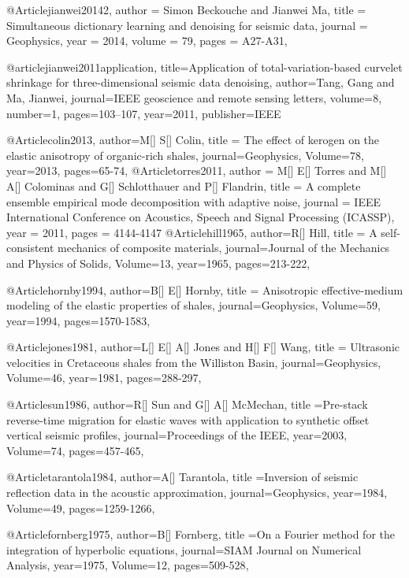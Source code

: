 {@Article{jianwei20142,
  author = 	 {Simon Beckouche and Jianwei Ma},
  title = 	 {Simultaneous dictionary learning and denoising for seismic data},
  journal = 	 {Geophysics},
  year = 	 2014,
  volume =	 79,
  pages =	 {A27-A31},
}

@article{jianwei2011application,
  title={Application of total-variation-based curvelet shrinkage for three-dimensional seismic data denoising},
  author={Tang, Gang and Ma, Jianwei},
  journal={IEEE geoscience and remote sensing letters},
  volume={8},
  number={1},
  pages={103--107},
  year={2011},
  publisher={IEEE}
}

@Article{colin2013,
  author={M[] S[] Colin},
  title = {The effect of kerogen on the elastic anisotropy of organic-rich shales},
  journal={Geophysics},
  Volume=78,
  year=2013,
  pages={65-74},
}
@Article{torres2011,
  author = 	 {M[] E[] Torres and M[] A[] Colominas and G[] Schlotthauer and P[] Flandrin},
  title = 	 {A complete ensemble empirical mode decomposition with adaptive noise},
  journal = 	 {IEEE International Conference on Acoustics, Speech and Signal Processing (ICASSP)},
  year = 	 2011,
  pages = 	 {4144-4147}
}
@Article{hill1965,
  author={R[] Hill},
  title = {A self-consistent mechanics of composite materials},
  journal={Journal of the Mechanics and Physics of Solids},
  Volume=13,
  year=1965,
  pages={213-222},
}

@Article{hornby1994,
  author={B[] E[] Hornby},
  title = {Anisotropic effective-medium modeling of the elastic properties of shales},
  journal={Geophysics},
  Volume=59,
  year=1994,
  pages={1570-1583},
}

@Article{jones1981,
  author={L[] E[] A[] Jones and H[] F[] Wang},
  title = {Ultrasonic velocities in Cretaceous shales from the Williston Basin},
  journal={Geophysics},
  Volume=46,
  year=1981,
  pages={288-297},
}


@Article{sun1986,
  author={R[] Sun and G[] A[] McMechan},
  title ={Pre-stack reverse-time migration for elastic waves with application to synthetic offset vertical seismic profiles},
  journal={Proceedings of the IEEE},
  year=2003,
  Volume=74,
  pages={457-465},
}

@Article{tarantola1984,
  author={A[] Tarantola},
  title ={Inversion of seismic reflection data in the acoustic approximation},
  journal={Geophysics},
  year=1984,
  Volume=49,
  pages={1259-1266},
}

@Article{fornberg1975,
  author={B[] Fornberg},
  title ={On a Fourier method for the integration of hyperbolic equations},
  journal={SIAM Journal on Numerical Analysis},
  year=1975,
  Volume=12,
  pages={509-528},
}

}
